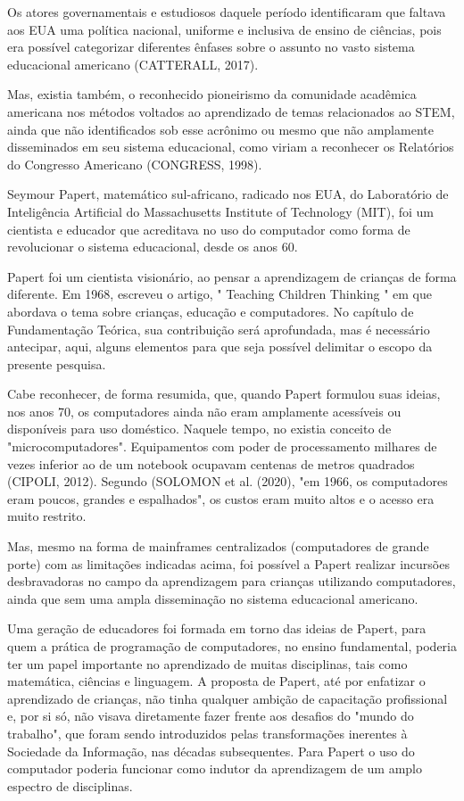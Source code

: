 Os atores governamentais e estudiosos daquele período identificaram que faltava aos EUA uma política nacional, uniforme e inclusiva de ensino de ciências, pois era possível categorizar diferentes ênfases sobre o assunto no vasto sistema educacional americano (CATTERALL, 2017).

Mas, existia também, o reconhecido pioneirismo da comunidade acadêmica americana nos métodos voltados ao aprendizado de temas relacionados ao STEM, ainda que não identificados sob esse acrônimo ou mesmo que não amplamente disseminados em seu sistema educacional, como viriam a reconhecer os Relatórios do Congresso Americano (CONGRESS,  1998).

Seymour Papert, matemático sul-africano, radicado nos EUA, do Laboratório de Inteligência Artificial do Massachusetts Institute of Technology (MIT), foi um  cientista e educador que acreditava  no  uso do computador como forma de revolucionar o sistema  educacional,  desde os anos 60.

Papert foi um cientista visionário, ao pensar a aprendizagem de crianças de forma diferente. Em 1968, escreveu o artigo, " Teaching Children Thinking "  em que abordava  o tema sobre crianças, educação e computadores. No capítulo de Fundamentação Teórica, sua contribuição será aprofundada, mas é necessário antecipar, aqui, alguns elementos para que seja possível delimitar o escopo da presente pesquisa.

Cabe reconhecer, de forma resumida, que, quando Papert formulou suas ideias, nos anos 70, os computadores ainda não eram amplamente acessíveis ou disponíveis para uso doméstico. Naquele tempo, no existia conceito de "microcomputadores". Equipamentos com poder de processamento milhares de vezes inferior ao de um notebook ocupavam centenas de metros quadrados (CIPOLI, 2012). Segundo (SOLOMON et al. (2020), "em 1966, os computadores eram poucos, grandes e espalhados", os custos eram muito altos e o acesso era muito restrito.

Mas, mesmo na forma de mainframes centralizados (computadores de grande porte) com as limitações indicadas acima, foi possível a Papert realizar incursões desbravadoras no campo da aprendizagem para crianças utilizando computadores, ainda que sem uma ampla disseminação no sistema educacional americano.

Uma geração de educadores foi formada em torno das ideias de Papert, para quem a prática de programação de computadores, no ensino fundamental, poderia ter um papel importante no aprendizado de muitas disciplinas, tais como matemática, ciências e linguagem. A proposta de Papert, até por enfatizar o aprendizado de crianças, não tinha qualquer ambição de capacitação profissional e, por si só, não visava diretamente fazer frente aos desafios do "mundo do trabalho", que foram sendo introduzidos pelas transformações inerentes à Sociedade da Informação, nas décadas subsequentes. Para Papert o uso do computador poderia funcionar como indutor da aprendizagem de um amplo espectro de disciplinas.

